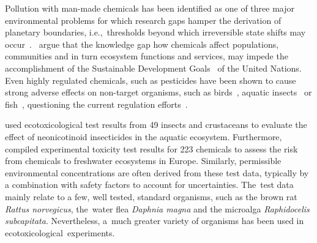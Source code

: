 \documentclass[data,datadescriptor,accept,moreauthors,pdftex]{Definitions/mdpi}
\begin{document}
Pollution with man-made chemicals has been identified as one of three major environmental problems for which research gaps hamper the derivation of planetary boundaries, i.e.,~thresholds beyond which irreversible state shifts may occur~\citep{steffen_anthropocene_2007, steffen_planetary_2015}.~\citet{bernhardt_synthetic_2017} argue that the knowledge gap how chemicals affect populations, communities and in turn ecosystem functions and services, may impede the accomplishment of the Sustainable Development Goals~\citep{rosa_transforming_2017} of the United Nations. Even highly regulated chemicals, such as pesticides have been shown to cause strong adverse effects on non-target organisms, such as birds~\citep{hallmann_declines_2014}, aquatic insects~\citep{beketov_pesticides_2013} or fish~\citep{yamamuro_neonicotinoids_2019}, questioning the current regulation efforts~\citep{schafer_future_2019}.

 used ecotoxicological test results from 49 insects and crustaceans to evaluate the effect of neonicotinoid insecticides in the aquatic ecosystem. Furthermore,~\citet{malaj_organic_2014} compiled experimental toxicity test results for 223 chemicals to assess the risk from chemicals to freshwater ecosystems in Europe. Similarly, permissible environmental concentrations are often derived from these test data, typically by a combination with safety factors to account for uncertainties. The~test data mainly relate to a few, well tested, standard organisms, such as the brown rat \textit{Rattus norvegicus}, the~water flea \textit{Daphnia magna} and the microalga \textit{Raphidocelis subcapitata}. Nevertheless, a~much greater variety of organisms has been used in ecotoxicological~experiments.
\end{document}
